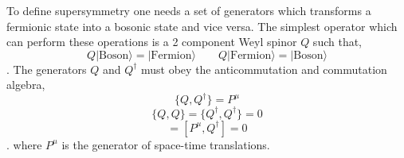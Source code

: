 To define supersymmetry one needs a set of generators which 
transforms a fermionic state into a bosonic state and vice versa. The simplest 
operator which can perform these operations is a 2 component Weyl spinor $Q$
such that,
\begin{equation}
Q|\mathrm{Boson}\rangle=|\mathrm{Fermion}\rangle \qquad Q|\mathrm{Fermion}\rangle=|\mathrm{Boson}\rangle
\end{equation}.
The generators $Q$ and $Q^{\dagger}$ must obey the anticommutation
and commutation algebra,
\begin{equation}
\{Q,Q^{\dagger}\}=P^{\mu}
\end{equation}
\begin{equation}
\{Q,Q\}=\{Q^{\dagger},Q^{\dagger}\}=0
\end{equation}
\begin{equation}
[P^{\mu},Q ]=[P^{\mu},Q^{\dagger}]=0
\end{equation}.
where $P^{\mu}$ is the generator of space-time translations.

